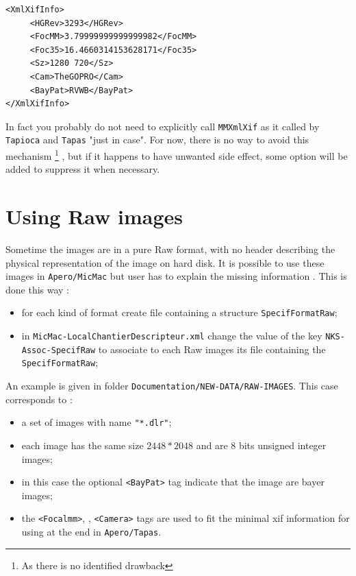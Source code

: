 \begin{verbatim}
<XmlXifInfo>
     <HGRev>3293</HGRev>
     <FocMM>3.79999999999999982</FocMM>
     <Foc35>16.4660314153628171</Foc35>
     <Sz>1280 720</Sz>
     <Cam>TheGOPRO</Cam>
     <BayPat>RVWB</BayPat>
</XmlXifInfo>
\end{verbatim}


In fact you probably do not need to explicitly call  {\tt MMXmlXif} as it called by {\tt Tapioca} and {\tt Tapas}
"just in case". For now, there is no way to avoid this mechanism \footnote{As there is no identified drawback}
, but if it happens to have unwanted side effect,
some option will be added to suppress it when necessary.





\section{Using Raw images}

Sometime the images are in a pure Raw format, with no header describing the physical representation
of the image on hard disk. It is possible to use these images in {\tt Apero/MicMac} but user has
to explain the missing information . This is done this way :

\begin{itemize}
       \item for each kind of format create file containing a structure {\tt SpecifFormatRaw};

       \item in {\tt MicMac-LocalChantierDescripteur.xml} change the value of the key {\tt NKS-Assoc-SpecifRaw} to associate to each Raw images its file containing the {\tt SpecifFormatRaw};

\end{itemize}

An example is given in folder {\tt Documentation/NEW-DATA/RAW-IMAGES}. This case corresponds to :


\begin{itemize}

       \item a set of images with name {\tt "*.dlr"};

       \item each image has the same size $2448 * 2048$ and are $8$ bits unsigned integer images;

       \item in this case the optional {\tt <BayPat>} tag indicate that the image are bayer images;

       \item the {\tt <Focalmm>}, {\tt <FocalEqui35>} , {\tt <Camera>} tags are used to fit the minimal 
             xif information for using at the end in {\tt Apero/Tapas}. 

\end{itemize}

